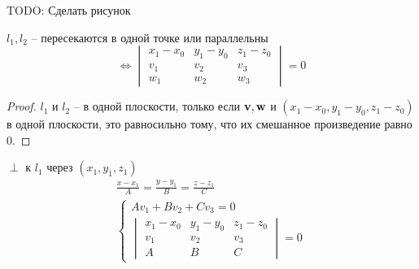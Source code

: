 \documentclass[main]{subfiles}
\begin{document}
\begin{theorem}
    TODO: Сделать рисунок

    $l_1, l_2$ -- пересекаются в одной точке или параллельны
    \[\Leftrightarrow
        \begin{vmatrix}
            x_1 - x_0 & y_1-y_0 & z_1-z_0 \\
            v_1       & v_2     & v_3     \\
            w_1       & w_2     & w_3
        \end{vmatrix} = 0\]
\end{theorem}
\begin{proof}
    $l_1$ и $l_2$ -- в одной плоскости, только если $\mathbf{v}, \mathbf{w}$ и
    $(x_1-x_0, y_1-y_0, z_1-z_0)$ в одной плоскости, это равносильно тому, что
    их смешанное произведение равно 0.
\end{proof}
\begin{example}
    $\perp$ к $l_1$ через $(x_1, y_1, z_1)$
    \begin{gather*}
        \frac{x-x_1}{A} = \frac{y-y_1}{B} = \frac{z-z_1}{C}\\
        \begin{cases}
            Av_1 + Bv_2 + Cv_3 = 0 \\
            \begin{vmatrix}
                x_1 - x_0 & y_1-y_0 & z_1-z_0 \\
                v_1       & v_2     & v_3     \\
                A         & B       & C
            \end{vmatrix} = 0
        \end{cases}
    \end{gather*}
\end{example}
\end{document}
